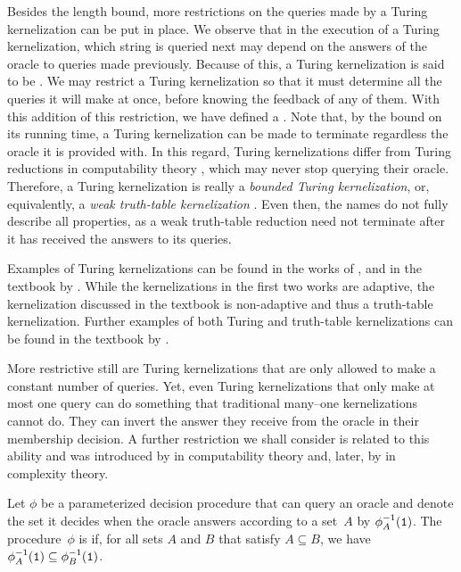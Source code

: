 Besides the length bound, more restrictions on the queries made by a Turing kernelization can be put in place.
We observe that in the execution of a Turing kernelization, which string is queried next may depend on the answers of the oracle to queries made previously.
Because of this, a Turing kernelization is said to be .
We may restrict a Turing kernelization so that it must determine all the queries it will make at once, before knowing the feedback of any of them.
With this addition of this restriction, we have defined a .
Note that, by the bound on its running time, a Turing kernelization can be made to terminate regardless the oracle it is provided with.
In this regard, Turing kernelizations differ from Turing reductions in computability theory \parencite{rogers1967theory,odifreddi1992classical}, which may never stop querying their oracle.
Therefore, a Turing kernelization is really a \emph{bounded Turing kernelization}, or, equivalently, a \emph{weak truth-table kernelization} \parencite{odifreddi1992classical} \parencite[see also][Section~2.4.3]{downey2010algorithmic}.
Even then, the names do not fully describe all properties, as a weak truth-table reduction need not terminate after it has received the answers to its queries.

Examples of Turing kernelizations can be found in the works of \textcite{jansen2017turing,thomasse2017polynomial}, and in the textbook by \textcite[][Section~9.4]{cygan2015parameterized}.
While the kernelizations in the first two works are adaptive, the kernelization discussed in the textbook is non-adaptive and thus a truth-table kernelization.
Further examples of both Turing and truth-table kernelizations can be found in the textbook by \textcite{fomin2019kernelization}.

More restrictive still are Turing kernelizations that are only allowed to make a constant number of queries.
Yet, even Turing kernelizations that only make at most one query can do something that traditional many--one kernelizations cannot do.
They can invert the answer they receive from the oracle in their membership decision.
A further restriction we shall consider is related to this ability and was introduced by \textcite{jockusch1968semirecursive} in computability theory and, later, by \textcite{selman1982analogues} in complexity theory.
\begin{definition}
  Let $\phi$ be a parameterized decision procedure that can query an oracle and denote the set it decides when the oracle answers according to a set~$A$ by $\phi_A^{-1}(\textnormal{\texttt{1}})$.
  The procedure~$\phi$ is  if, for all sets $A$ and $B$ that satisfy $A \subseteq B$, we have $\phi_A^{-1}(\textnormal{\texttt{1}}) \subseteq \phi_B^{-1}(\textnormal{\texttt{1}})$.
\end{definition}

